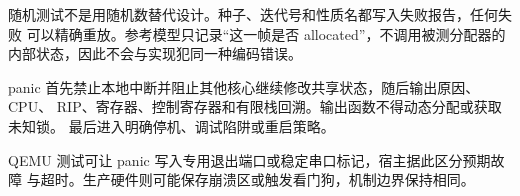 随机测试不是用随机数替代设计。种子、迭代号和性质名都写入失败报告，任何失败
可以精确重放。参考模型只记录“这一帧是否 allocated”，不调用被测分配器的
内部状态，因此不会与实现犯同一种编码错误。

panic 首先禁止本地中断并阻止其他核心继续修改共享状态，随后输出原因、CPU、
RIP、寄存器、控制寄存器和有限栈回溯。输出函数不得动态分配或获取未知锁。
最后进入明确停机、调试陷阱或重启策略。

QEMU 测试可让 panic 写入专用退出端口或稳定串口标记，宿主据此区分预期故障
与超时。生产硬件则可能保存崩溃区或触发看门狗，机制边界保持相同。
